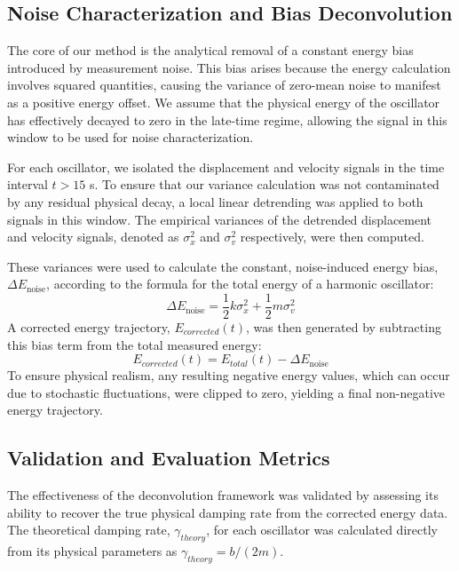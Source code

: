 \documentclass[]{article}
\begin{document}
\subsection{Noise Characterization and Bias Deconvolution}
The core of our method is the analytical removal of a constant energy bias introduced by measurement noise. This bias arises because the energy calculation involves squared quantities, causing the variance of zero-mean noise to manifest as a positive energy offset. We assume that the physical energy of the oscillator has effectively decayed to zero in the late-time regime, allowing the signal in this window to be used for noise characterization.

For each oscillator, we isolated the displacement and velocity signals in the time interval $t > 15$ s. To ensure that our variance calculation was not contaminated by any residual physical decay, a local linear detrending was applied to both signals in this window. The empirical variances of the detrended displacement and velocity signals, denoted as $\sigma_x^2$ and $\sigma_v^2$ respectively, were then computed.

These variances were used to calculate the constant, noise-induced energy bias, $\Delta E_{\text{noise}}$, according to the formula for the total energy of a harmonic oscillator:
\begin{equation}
\Delta E_{\text{noise}} = \frac{1}{2} k \sigma_x^2 + \frac{1}{2} m \sigma_v^2
\end{equation}
A corrected energy trajectory, $E_{corrected}(t)$, was then generated by subtracting this bias term from the total measured energy:
\begin{equation}
E_{corrected}(t) = E_{total}(t) - \Delta E_{\text{noise}}
\end{equation}
To ensure physical realism, any resulting negative energy values, which can occur due to stochastic fluctuations, were clipped to zero, yielding a final non-negative energy trajectory.

\subsection{Validation and Evaluation Metrics}
The effectiveness of the deconvolution framework was validated by assessing its ability to recover the true physical damping rate from the corrected energy data. The theoretical damping rate, $\gamma_{theory}$, for each oscillator was calculated directly from its physical parameters as $\gamma_{theory} = b / (2m)$.
\end{document}
